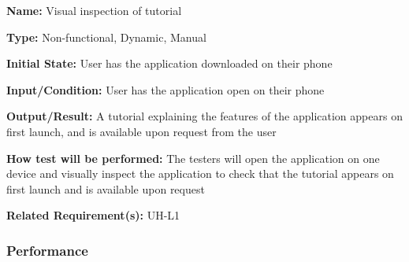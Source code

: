 \documentclass[12pt, titlepage]{article}
\begin{document}
\begin{enumerate}
\textbf{Name:} Visual inspection of tutorial

\textbf{Type:} Non-functional, Dynamic, Manual
					
\textbf{Initial State:} User has the application downloaded on their phone
					
\textbf{Input/Condition:} User has the application open on their phone
					
\textbf{Output/Result:} A tutorial explaining the features of the application appears on first launch, and is available upon request from the user

\textbf{How test will be performed:} The testers will open the application on one device and visually inspect the application to check that the tutorial appears on first launch and is available upon request

\textbf{Related Requirement(s):} UH-L1
\end{enumerate}

\subsubsection{Performance}
\end{document}

